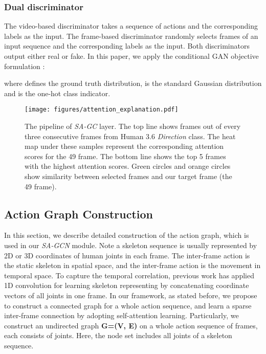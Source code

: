 \documentclass[runningheads]{llncs}
\begin{document}
\subsubsection{Dual discriminator}
The video-based discriminator  takes a sequence of actions and the corresponding labels as the input. The frame-based discriminator  randomly selects  frames of an input sequence and the corresponding labels as the input. Both discriminators output either real or fake. 
In this paper, we apply the conditional GAN objective formulation \cite{goodfellow2014generative,mirza2014conditional,li2017alice}:



where  defines the ground truth distribution,  is the standard Gaussian distribution and  is the one-hot class indicator.








\begin{figure}[!b]
    \centering
    \texttt{[image: figures/attention\_explanation.pdf]}
    \caption{\small{The pipeline of {\it SA-GC} layer. The top line shows frames out of every three consecutive frames from Human 3.6 {\it Direction} class. The heat map under these samples represent the corresponding attention scores for the 49 frame. The bottom line shows the top 5 frames with the highest attention scores. Green circles and orange circles show similarity between selected frames and our target frame (the 49 frame). }}
    \label{fig:frame_att}
\end{figure}

\subsection{Action Graph Construction}\label{sec:agc}
In this section, we describe detailed construction of the action graph, which is used in our {\it SA-GCN} module. Note a skeleton sequence is usually represented by 2D or 3D coordinates of human joints in each frame. The inter-frame action is the static skeleton in spatial space, and the inter-frame action is the movement in temporal space. 
To capture the temporal correlation, previous work has applied 1D convolution for learning skeleton representing by concatenating coordinate vectors of all joints in one frame. 
In our framework, as stated before, we propose to construct a connected graph for a whole action sequence, and learn a sparse inter-frame connection by adopting self-attention learning. Particularly, we construct an undirected graph \textbf{G=(V, E)} on a whole action sequence of  frames, each consists of  joints. Here, the node set  includes all joints of a skeleton sequence. 
\end{document}
